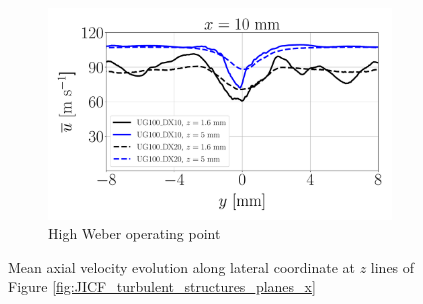 \begin{figure}[ht]
\begin{subfigure}[b]{1.0\textwidth}
   \includegraphics[scale=0.24]{./part2_developments/figures_ch5_resolved_JICF/turbulent_structures/lines_iso-x_along_y_ux_mean_UG100_x10}
   \vspace*{-0.1in}
	\caption{High Weber operating point}
\end{subfigure}
   \caption{Mean axial velocity evolution along lateral coordinate at $z$ lines of Figure \ref{fig:JICF_turbulent_structures_planes_x}}
\label{fig:JICF_sps_lines_iso-x_along_y_ux_mean}
\end{figure}


